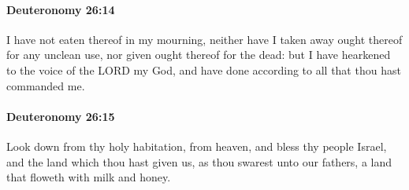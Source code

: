		\paragraph{Deuteronomy 26:14} %
			\label{DEUTERONOMY-26-14}

			I have not eaten thereof in my mourning, neither have I taken away ought thereof for any unclean use, nor given ought thereof for the dead: but I have hearkened to the voice of the LORD my God, and have done according to all that thou hast commanded me.


		\paragraph{Deuteronomy 26:15} %
			\label{DEUTERONOMY-26-15}

			Look down from thy holy habitation, from heaven, and bless thy people Israel, and the land which thou hast given us, as thou swarest unto our fathers, a land that floweth with milk and honey.

